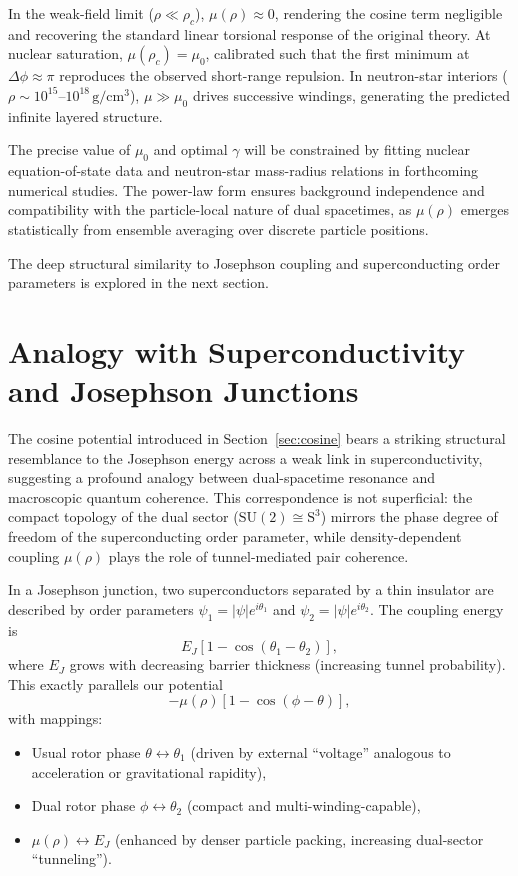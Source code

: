 \documentclass[a4paper]{article}
\begin{document}
In the weak-field limit ($\rho \ll \rho_c$), $\mu(\rho) \approx 0$, rendering the cosine term negligible and recovering the standard linear torsional response of the original theory. At nuclear saturation, $\mu(\rho_c) = \mu_0$, calibrated such that the first minimum at $\Delta\phi \approx \pi$ reproduces the observed short-range repulsion. In neutron-star interiors ($\rho \sim 10^{15}$--$10^{18} \, \mathrm{g/cm^3}$), $\mu \gg \mu_0$ drives successive windings, generating the predicted infinite layered structure.

The precise value of $\mu_0$ and optimal $\gamma$ will be constrained by fitting nuclear equation-of-state data and neutron-star mass-radius relations in forthcoming numerical studies. The power-law form ensures background independence and compatibility with the particle-local nature of dual spacetimes, as $\mu(\rho)$ emerges statistically from ensemble averaging over discrete particle positions.

The deep structural similarity to Josephson coupling and superconducting order parameters is explored in the next section.

\section{Analogy with Superconductivity and Josephson Junctions}
\label{sec:analogy}

The cosine potential introduced in Section~\ref{sec:cosine} bears a striking structural resemblance to the Josephson energy across a weak link in superconductivity, suggesting a profound analogy between dual-spacetime resonance and macroscopic quantum coherence. This correspondence is not superficial: the compact topology of the dual sector ($\text{SU}(2) \cong \text{S}^3$) mirrors the phase degree of freedom of the superconducting order parameter, while density-dependent coupling $\mu(\rho)$ plays the role of tunnel-mediated pair coherence.

In a Josephson junction, two superconductors separated by a thin insulator are described by order parameters $\psi_1 = |\psi| e^{i\theta_1}$ and $\psi_2 = |\psi| e^{i\theta_2}$. The coupling energy is
\[
E_J [1 - \cos(\theta_1 - \theta_2)],
\]
where $E_J$ grows with decreasing barrier thickness (increasing tunnel probability). This exactly parallels our potential
\[
-\mu(\rho) [1 - \cos(\phi - \theta)],
\]
with mappings:
\begin{itemize}
  \item Usual rotor phase $\theta \leftrightarrow \theta_1$ (driven by external ``voltage'' analogous to acceleration or gravitational rapidity),
  \item Dual rotor phase $\phi \leftrightarrow \theta_2$ (compact and multi-winding-capable),
  \item $\mu(\rho) \leftrightarrow E_J$ (enhanced by denser particle packing, increasing dual-sector ``tunneling'').
\end{itemize}
\end{document}
